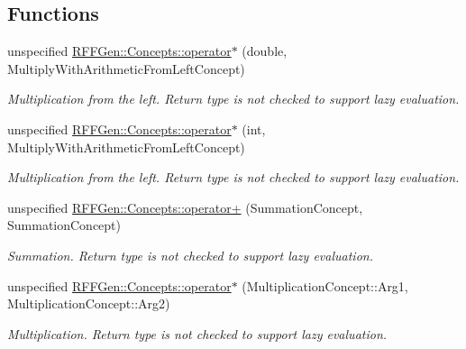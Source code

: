 \subsection*{Functions}
\begin{DoxyCompactItemize}
\item 
\hypertarget{group__MultiplyWithArithmeticFromLeftConcept_ga8da9a0d637544b02ae5a40a03e445584}{unspecified \hyperlink{group__MultiplyWithArithmeticFromLeftConcept_ga8da9a0d637544b02ae5a40a03e445584}{R\-F\-F\-Gen\-::\-Concepts\-::operator$\ast$} (double, Multiply\-With\-Arithmetic\-From\-Left\-Concept)}\label{group__MultiplyWithArithmeticFromLeftConcept_ga8da9a0d637544b02ae5a40a03e445584}

\begin{DoxyCompactList}\small\item\em Multiplication from the left. Return type is not checked to support lazy evaluation. \end{DoxyCompactList}\item 
\hypertarget{group__MultiplyWithArithmeticFromLeftConcept_gab8bd740daf219fda12c9c9ecbadfc420}{unspecified \hyperlink{group__MultiplyWithArithmeticFromLeftConcept_gab8bd740daf219fda12c9c9ecbadfc420}{R\-F\-F\-Gen\-::\-Concepts\-::operator$\ast$} (int, Multiply\-With\-Arithmetic\-From\-Left\-Concept)}\label{group__MultiplyWithArithmeticFromLeftConcept_gab8bd740daf219fda12c9c9ecbadfc420}

\begin{DoxyCompactList}\small\item\em Multiplication from the left. Return type is not checked to support lazy evaluation. \end{DoxyCompactList}\item 
\hypertarget{group__SummationConcept_ga62ff2da5538973120310c4e4c88cc27c}{unspecified \hyperlink{group__SummationConcept_ga62ff2da5538973120310c4e4c88cc27c}{R\-F\-F\-Gen\-::\-Concepts\-::operator+} (Summation\-Concept, Summation\-Concept)}\label{group__SummationConcept_ga62ff2da5538973120310c4e4c88cc27c}

\begin{DoxyCompactList}\small\item\em Summation. Return type is not checked to support lazy evaluation. \end{DoxyCompactList}\item 
\hypertarget{group__MultiplicationConcept_gadeb3d764f7d3af3c5ff67ba9e78deb15}{unspecified \hyperlink{group__MultiplicationConcept_gadeb3d764f7d3af3c5ff67ba9e78deb15}{R\-F\-F\-Gen\-::\-Concepts\-::operator$\ast$} (Multiplication\-Concept\-::\-Arg1, Multiplication\-Concept\-::\-Arg2)}\label{group__MultiplicationConcept_gadeb3d764f7d3af3c5ff67ba9e78deb15}

\begin{DoxyCompactList}\small\item\em Multiplication. Return type is not checked to support lazy evaluation. \end{DoxyCompactList}\end{DoxyCompactItemize}
